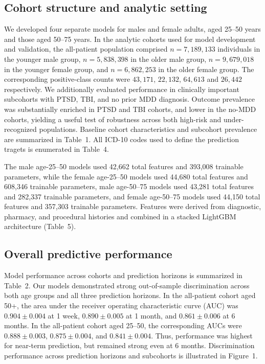 \documentclass[onecolumn, compsoc,11pt]{IEEEtran}
\begin{document}
\subsection*{Cohort structure and analytic setting}
We developed four separate models for males and female adults, aged 25--50 years and those aged 50--75 years. In the analytic cohorts used for model development and validation, the all-patient population comprised $n=7{,}189{,}133$ individuals in the younger male group, $n=5{,}838{,}398$ in the older male group, $n=9{,}679{,}018$ in the younger female group, and $n=6{,}862{,}253$ in the older female group. The corresponding positive-class counts were $43,171$, $22,132$, $64,613$ and $26,442$  respectively. 
We additionally evaluated performance in clinically important subcohorts with PTSD, TBI, and no prior MDD diagnosis. Outcome prevalence was substantially enriched in PTSD and TBI cohorts, and lower in the no-MDD cohorts, yielding a useful test of robustness across both high-risk and under-recognized populations. Baseline cohort characteristics and subcohort prevalence are summarized in Table~1.
All ICD-10 codes used to define the prediction tragets is enumerated in Table~4.

The male age-25--50 models used 42,662 total features and 393,008 trainable parameters, while the female age-25--50 models used 44,680 total features and 608,346 trainable parameters, male age-50--75 models used 43,281 total features and 282,337 trainable parameters, and female age-50--75 models used 44,150 total features and 357,303 trainable parameters. Features were derived from diagnostic, pharmacy, and procedural histories and combined in a stacked LightGBM architecture (Table~5).

\subsection*{Overall predictive performance}
Model performance across cohorts and prediction horizons is summarized in Table~2. Our models demonstrated strong out-of-sample discrimination across both age groups and all three prediction horizons. In the all-patient cohort aged 50+, the area under the receiver operating characteristic curve (AUC) was $0.904 \pm 0.004$ at 1 week, $0.890 \pm 0.005$ at 1 month, and $0.861 \pm 0.006$ at 6 months. In the all-patient cohort aged 25--50, the corresponding AUCs were $0.888 \pm 0.003$, $0.875 \pm 0.004$, and $0.841 \pm 0.004$. Thus, performance was highest for near-term prediction, but remained strong even at 6 months.
Discrimination performance across prediction horizons and subcohorts is illustrated in Figure~1.
\end{document}
